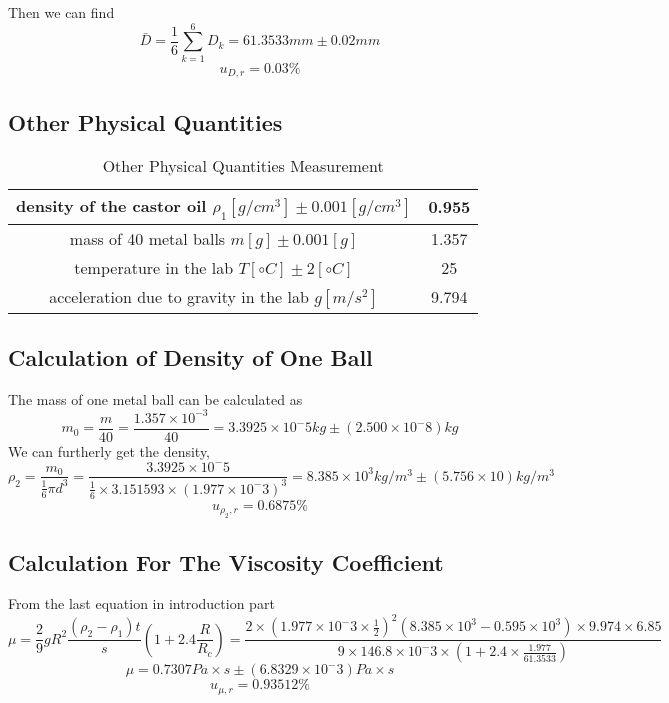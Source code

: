 Then we can find
$$  \bar{D} = \frac{1}{6} \sum_{k=1}^{6} D_k =  61.3533 mm \pm  0.02 mm   $$
$$  u_{D,r} =   0.03\%  $$ 


\subsection{Other Physical Quantities}

\begin{table}[H]
  \centering
  \begin{tabular}{|c|c|}
    \hline
    density of the castor oil $ \rho_1 [g/cm^3] \pm 0.001 [g/cm^3] $ & 0.955  \\ \hline 
    mass of 40 metal balls $ m  [g] \pm 0.001 [g] $ & 1.357 \\ \hline
    temperature in the lab $ T  [\circ C] \pm 2 [\circ C] $ & 25 \\ \hline
    acceleration due to gravity in the lab $ g [m/s^2] $ & 9.794 \\ \hline
  \end{tabular}
  \caption{Other Physical Quantities Measurement}
\end{table}

\subsection{Calculation of Density of One Ball}

The mass of one  metal ball can be calculated as
$$  m_0 = \frac{m}{40} = \frac{1.357 \times 10^{-3} }{40} = 3.3925 \times 10^-5 kg
\pm (2.500 \times 10^-8) kg $$ 
We can furtherly get the density,
$$ \rho_2 = \frac{m_0}{\frac{1}{6} \pi d^3} = \frac{3.3925 \times 10^-5
}{\frac{1}{6} \times 3.151593 \times (1.977 \times 10^-3)^3 } = 8.385 \times
10^3 kg/m^3 \pm (5.756 \times 10  ) kg/m^3  $$
$$  u_{\rho_2,r} =   0.6875\%  $$ 

\subsection{Calculation For The Viscosity Coefficient}
From the last equation in introduction part
$$ \mu = \frac{2}{9} g R^2 \frac{( \rho_2 - \rho_1 ) t  }{s} (1 + 2.4
\frac{R}{R_c})  =  \frac{2 \times (1.977 \times 10^-3 \times \frac{1}{2})^2
  (8.385\times 10^3 - 0.595 \times 10^3 ) \times 9.974 \times 6.85 }{9 \times
  146.8\times 10^-3 \times (1 + 2.4 \times \frac{1.977}{61.3533})} $$
$$ \mu = 0.7307 Pa \times s \pm (6.8329 \times 10^-3 ) Pa \times s  $$ 
$$  u_{\mu,r} =  0.93512 \%  $$ 

